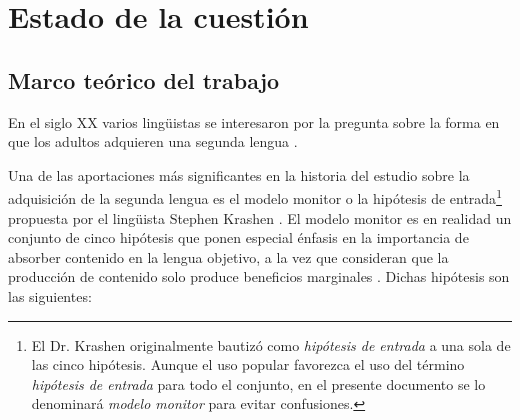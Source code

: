 \chapter{Estado de la cuestión}  

\section{Marco teórico del trabajo}

En el siglo XX varios lingüistas se interesaron por la pregunta sobre la forma en que los adultos adquieren una segunda lengua \autocite{Ellis_2021}. 

Una de las aportaciones más significantes en la historia del estudio sobre la adquisición de la segunda lengua es el modelo monitor o la hipótesis de entrada\footnote{El Dr. Krashen originalmente bautizó como \textit{hipótesis de entrada} a una sola de las cinco hipótesis. Aunque el uso popular favorezca el uso del término \textit{hipótesis de entrada} para todo el conjunto, en el presente documento se lo denominará \textit{modelo monitor} para evitar confusiones.} propuesta por el lingüista Stephen Krashen \autocite{Krashen2003}. El modelo monitor es en realidad un conjunto de cinco hipótesis que ponen especial énfasis en la importancia de absorber contenido en la lengua objetivo, a la vez que consideran que la producción de contenido solo produce beneficios marginales \autocite{Krashen2003}. Dichas hipótesis son las siguientes:
